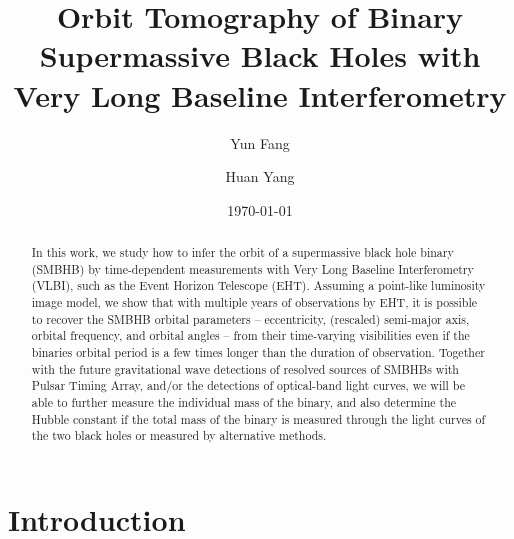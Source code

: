 \documentclass[twocolumn]{aastex62}
\begin{document}
\title{Orbit Tomography of  Binary Supermassive Black Holes with Very Long Baseline Interferometry}
	
\author{Yun Fang}

\author{Huan Yang}


\date{\today}

\begin{abstract}
In this work, we study how to infer the orbit of a supermassive black hole binary (SMBHB) by time-dependent measurements with Very Long Baseline Interferometry (VLBI), such as the Event Horizon Telescope (EHT). Assuming a point-like luminosity image model, we show that with multiple years of observations by EHT, it is possible to recover the SMBHB orbital parameters -- eccentricity, (rescaled) semi-major axis, orbital frequency, and orbital angles -- from their time-varying visibilities even if the binaries orbital period is a few times longer than the duration of observation. Together with the future gravitational wave detections of resolved sources of SMBHBs with Pulsar Timing Array, and/or the detections of optical-band light curves, we will be able to further measure the individual mass of the binary, and also determine the Hubble constant if the total mass of the binary is measured through the light curves of the two black holes or measured by alternative methods. 

\end{abstract}


	

\section{Introduction}
\end{document}
